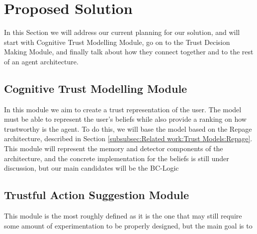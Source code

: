 \section{Proposed Solution}
\label{sec:Solution}
In this Section we will address our current planning for our solution, and will start with Cognitive Trust Modelling Module, go on to the Trust Decision Making Module, and finally talk about how they connect together and to the rest of an agent architecture.


\subsection{Cognitive Trust Modelling Module}
\label{subsec:Solution:Trust Assessment Module}
In this module we aim to create a trust representation of the user. The model must be able to represent the user's beliefs while also provide a ranking on how trustworthy is the agent. To do this, we will base the model based on the Repage architecture, described in Section \ref{subsubsec:Related work:Trust Models:Repage}. This module will represent the memory and detector components of the architecture, and the concrete implementation for the beliefs is still under discussion, but our main candidates will be the BC-Logic



\subsection{Trustful Action Suggestion Module}
\label{subsec:Solution:Trust Decision Making Module}
This module is the most roughly defined as it is the one that may still require some amount of experimentation to be properly designed, but the main goal is to 
